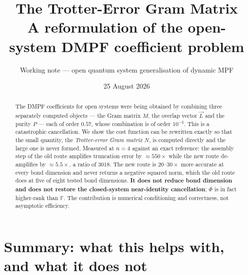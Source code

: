 \documentclass[11pt,a4paper]{article}
\title{\bfseries The Trotter-Error Gram Matrix\\[2pt]
\large A reformulation of the open-system DMPF coefficient problem}
\author{Working note --- open quantum system generalisation of dynamic MPF}
\date{25 August 2026}
\newcommand{\FF}{\mathbb{F}}\newcommand{\GG}{\mathbb{G}}\newcommand{\EE}{\mathbb{E}}
\begin{document}
\maketitle

\begin{abstract}\noindent
The DMPF coefficients for open systems were being obtained by combining three separately
computed objects --- the Gram matrix $M$, the overlap vector $\vec L$ and the purity $P$ ---
each of order $0.57$, whose combination is of order $10^{-4}$. This is a catastrophic
cancellation. We show the cost function can be rewritten exactly so that the small quantity,
the \emph{Trotter-error Gram matrix} $N$, is computed directly and the large one is never
formed. Measured at $n=4$ against an exact reference: the assembly step of the old route
amplifies truncation error by $\approx 550\times$ while the new route de-amplifies by
$\approx 5.5\times$, a ratio of $3018$. The new route is $20$--$30\times$ more accurate at
every bond dimension and never returns a negative squared norm, which the old route does at
five of eight tested bond dimensions. \textbf{It does not reduce bond dimension and does not
restore the closed-system near-identity cancellation}; $\Phi$ is in fact higher-rank than
$\FF$. The contribution is numerical conditioning and correctness, not asymptotic efficiency.
\end{abstract}

\section{Summary: what this helps with, and what it does not}
\end{document}
